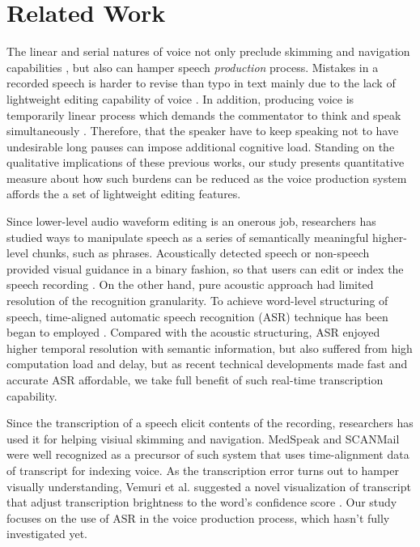 \section{Related Work}

The linear and serial natures of voice not only preclude skimming and navigation capabilities \cite{grudin}, but also can hamper speech \emph{production} process. Mistakes in a recorded speech is harder to revise than typo in text mainly due to the lack of lightweight editing capability of voice \cite{marriott2002}. In addition, producing voice is temporarily linear process which demands the commentator to think and speak simultaneously \cite{marriott2002, yoon:2015}. Therefore, that the speaker have to keep speaking not to have undesirable long pauses can impose additional cognitive load. Standing on the qualitative implications of these previous works, our study presents quantitative measure about how such burdens can be reduced as the voice production system affords the a set of lightweight editing features.

Since lower-level audio waveform editing is an onerous job, researchers has studied ways to manipulate speech as a series of semantically meaningful higher-level chunks, such as phrases. Acoustically detected speech or non-speech provided visual guidance in a binary fashion, so that users can edit or index the speech recording \cite{ades1986, hindus:1992}. On the other hand, pure acoustic approach had limited resolution of the recognition granularity. To achieve word-level structuring of speech, time-aligned automatic speech recognition (ASR) technique has been began to employed \cite{Schmandt81, Wilcox:1992}. Compared with the acoustic structuring, ASR enjoyed higher temporal resolution with semantic information, but also suffered from high computation load and delay, but as recent technical developments made fast and accurate ASR affordable, we take full benefit of such real-time transcription capability.

Since the transcription of a speech elicit contents of the recording, researchers has used it for helping visiual skimming and navigation. MedSpeak\cite{Lai:1997} and SCANMail \cite{whittaker} were well recognized as a precursor of such system that uses time-alignment data of transcript for indexing voice. As the transcription error turns out to hamper visually understanding, Vemuri et al. suggested a novel visualization of transcript that adjust transcription brightness to the word's confidence score \cite{Vemuri:2004}. Our study focuses on the use of ASR in the voice production process, which hasn't fully investigated yet.

